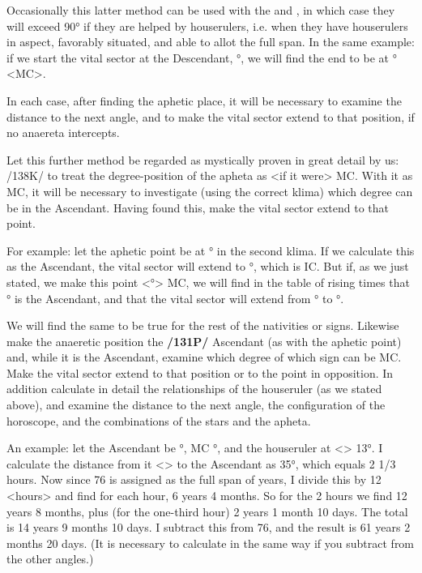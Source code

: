 Occasionally this latter method can be used with the \Sun\xspace and \Moon, in which case they will exceed 90° if they are helped by houserulers, i.e. when they have houserulers in aspect, favorably situated, and able to allot the full span. In the same example: if we start the vital sector at the Descendant, \Sagittarius\xspace 8°, we will find the end to be at \Aquarius\xspace 22° <MC>. 

In each case, after finding the aphetic place, it will be
necessary to examine the distance to the next angle, and to make the vital sector extend to that position, if no anaereta intercepts.

Let this further method be regarded as mystically proven in great detail by us: \textbf{}/138K/ to treat the degree-position of the apheta as <if it were> MC. With it as MC, it will be necessary to investigate (using the correct klima) which degree can be in the Ascendant. Having found this, make the vital sector extend to that point. 

For example: let the aphetic point be at \Scorpio\xspace 12° in the second klima. If we calculate this as the Ascendant, the vital sector will extend to \Aquarius\xspace 13°, which is IC. But if, as we just stated, we make this point <\Scorpio\xspace 12°> MC, we will find in the table of rising times that \Capricorn\xspace 28° is the Ascendant, and that the vital sector will extend from \Scorpio\xspace 12° to \Capricorn\xspace 28°. 

We will find the same to be true for the rest of the nativities or signs. Likewise make the anaeretic position the \textbf{/131P/} Ascendant (as with the aphetic point) and, while it is
the Ascendant, examine which degree of which sign can be MC. Make the vital sector extend to that position or to the point in opposition. In addition calculate in detail the relationships of the houseruler (as we stated above), and examine the distance to the next angle, the configuration of the horoscope, and the combinations of the stars and the apheta.

An example: let the Ascendant be \Sagittarius\xspace 18°, MC \Libra\xspace 4°, and the houseruler \Mercury\xspace at
<\Scorpio> 13°. I calculate the distance from it <\Mercury> to the Ascendant as 35°, which equals 2 1/3
hours. Now since 76 is assigned as the full span of years, I divide this by 12 <hours> and find for each hour, 6 years 4 months. So for the 2 hours we find 12 years 8 months, plus (for the one-third hour) 2 years 1 month 10 days. The total is 14 years 9 months 10 days. I subtract this from 76, and the result is 61 years 2 months 20 days. (It is necessary to calculate in the same way if you subtract from the other angles.)

